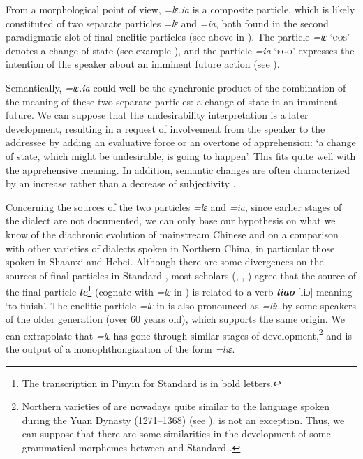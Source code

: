 \documentclass[output=paper,colorlinks,citecolor=brown, language=chinese]{langscibook}
\begin{document}
From a morphological point of view, \textit{=lɛ.ia} is a composite particle, which is likely constituted of two separate particles \textit{=lɛ} and \textit{=ia}, both found in the second paradigmatic slot of final enclitic particles (see  above in ). The particle \textit{=lɛ} \textsc{`cos'} denotes a change of state (see example ), and the particle \textit{=ia} \textsc{`ego'} expresses the intention of the speaker about an imminent future action (see ).

Semantically, \textit{=lɛ.ia} could well be the synchronic product of the combination of the meaning of these two separate particles: a change of state in an imminent future. We can suppose that the undesirability interpretation is a later development, resulting in a request of involvement from the speaker to the addressee by adding an evaluative force or an overtone of apprehension: `a change of state, which might be undesirable, is going to happen'. This fits quite well with the apprehensive meaning. In addition, semantic changes are often characterized by an increase rather than a decrease of subjectivity \citep[49]{Traugott1989}.

Concerning the sources of the two particles \textit{=lɛ} and \textit{=ia}, since earlier stages of the  dialect are not documented, we can only base our hypothesis on what we know of the diachronic evolution of mainstream  Chinese and on a comparison with other varieties of  dialects spoken in Northern China, in particular those spoken in Shaanxi and Hebei. Although there are some divergences on the sources of final particles in Standard , most scholars (\cite[Chapter 3]{Cao1987}, \cite[351]{Ōta1987}, \cite{Liu1985}) agree that the source of the final particle \textit{\textbf{le}}\footnote{The transcription in Pinyin for Standard  is in bold letters.} (cognate with \textit{=lɛ} in ) is related to a verb \textit{\textbf{liao}} [liɔ] meaning `to finish'. The enclitic particle \textit{=lɛ} in  is also pronounced as \textit{=liɛ} by some speakers of the older generation (over 60 years old), which supports the same origin. We can extrapolate that  \textit{=lɛ} has gone through similar stages of development,\footnote{Northern varieties of  are nowadays quite similar to the language spoken during the Yuan Dynasty (1271--1368) (see \cite[Chapter I]{LiZuDing2009}).  is not an exception. Thus, we can suppose that there are some similarities in the development of some grammatical morphemes between  and Standard .} and is the output of a monophthongization of the form \textit{=liɛ}.
\end{document}
